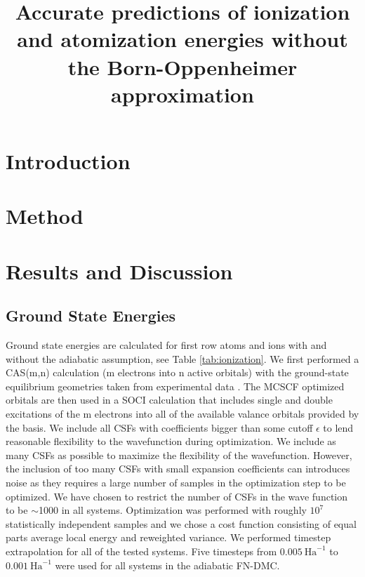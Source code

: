 \documentclass[pra,superscriptaddress,groupedaddress,twocolumn]{revtex4}
\begin{document}
\title{Accurate predictions of ionization and atomization energies without the Born-Oppenheimer approximation}


\maketitle

\section{Introduction}


\section{Method}


\section{Results and Discussion}


\subsection{Ground State Energies}

Ground state energies are calculated for first row atoms and ions with and without the adiabatic assumption, see Table \ref{tab:ionization}. We first performed a CAS(m,n) calculation (m electrons into n active orbitals) with the ground-state equilibrium geometries taken from experimental data \cite{CCCBDB}. The MCSCF optimized orbitals are then used in a SOCI calculation that includes single and double excitations of the m electrons into all of the available valance orbitals provided by the basis. We include all CSFs with coefficients bigger than some cutoff $\epsilon$ to lend reasonable flexibility to the wavefunction during optimization. We include as many CSFs as possible to maximize the flexibility of the wavefunction. However, the inclusion of too many CSFs with small expansion coefficients can introduces noise as they requires a large number of samples in the optimization step to be optimized. We have chosen to restrict the number of CSFs in the wave function to be $\sim$1000 in all systems. Optimization was performed with roughly $10^7$ statistically independent samples and we chose a cost function consisting of equal parts average local energy and reweighted variance. We performed timestep extrapolation for all of the tested systems. Five timesteps from $0.005~\text{Ha}^{-1}$ to $0.001~\text{Ha}^{-1}$ were used for all systems in the adiabatic FN-DMC.
\end{document}

